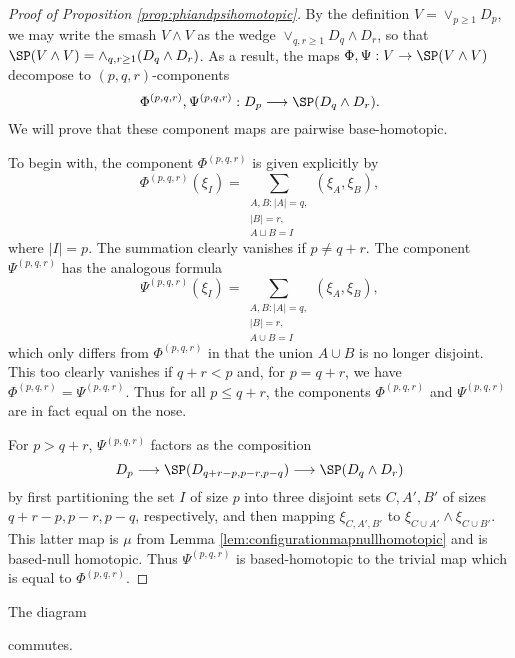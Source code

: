 \begin{proof}[Proof of Proposition \ref{prop:phiandpsihomotopic}]
    By the definition $V=\vee_{p\ge 1}D_p$, we may write the smash $V\wedge V$ as the wedge $\vee_{q,r\ge 1}D_q\wedge D_r$, so that $\SP(V\wedge V)=\wedge_{q,r\ge 1}(D_q\wedge D_r)$. As a result, the maps $\Phi,\Psi:V\to \SP(V\wedge V)$ decompose to $(p,q,r)$-components  $$\Phi^{(p,q,r)},\Psi^{(p,q,r)}: D_p\longrightarrow \SP(D_q\wedge D_r).$$
    We will prove that these component maps are pairwise base-homotopic.
    
    To begin with, the component $\Phi^{(p,q,r)}$ is given explicitly by  $$\Phi^{(p,q,r)}(\xi_I)=\sum_{\substack{A,B:|A|=q,\\|B|=r,\\ A\sqcup B=I}}(\xi_A,\xi_B),$$ where $|I|=p$. The summation clearly vanishes if $p\neq q+r$. The component $\Psi^{(p,q,r)}$ has the analogous formula 
    $$\Psi^{(p,q,r)}(\xi_I)=\sum_{\substack{A,B:|A|=q,\\|B|=r, \\A\cup B=I}}(\xi_A,\xi_B),$$ which  only differs from $\Phi^{(p,q,r)}$ in that the union $A\cup B$ is no longer disjoint. This too clearly vanishes if $q+r<p$ and, for $p=q+r$, we have $\Phi^{(p,q,r)}=\Psi^{(p,q,r)}$. Thus for all $p\le q+r$, the components $\Phi^{(p,q,r)}$ and $\Psi^{(p,q,r)}$ are in fact equal on the nose. 
    
    For $p>q+r$, $\Psi^{(p,q,r)}$ factors as the composition
    \begin{equation*}
        D_p\longrightarrow \SP(D_{q+r-p, p-r,p-q})\longrightarrow \SP(D_q\wedge D_r)
    \end{equation*}
    by first partitioning the set $I$ of size $p$ into three disjoint sets $C,A',B'$ of sizes $q+r-p, p-r, p-q$, respectively, and then mapping $\xi_{C,A',B'}$ to $\xi_{C\cup A'}\wedge \xi_{C\cup B'}$. This latter map is $\mu$ from Lemma \ref{lem:configurationmapnullhomotopic} and is based-null homotopic. Thus $\Psi^{(p,q,r)}$ is based-homotopic to the trivial map which is equal to $\Phi^{(p,q,r)}$.
\end{proof}

\begin{corollary}\label{cor:DeltacommuteswithPhi}
The diagram
    \begin{center}
    \end{center}
    commutes.
\end{corollary}
    
